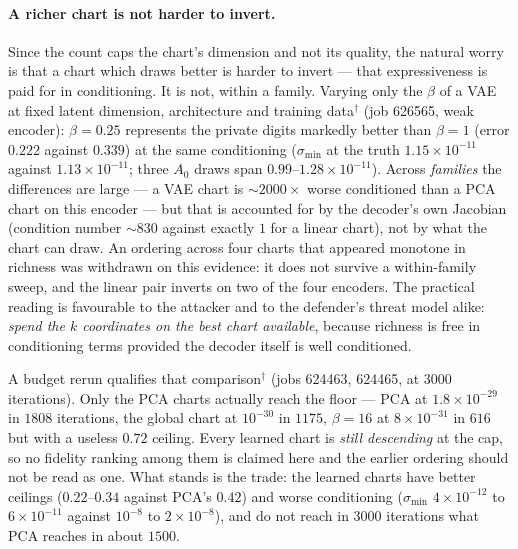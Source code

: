 \paragraph{A richer chart is not harder to invert.} Since the count caps the
chart's dimension and not its quality, the natural worry is that a chart
which draws better is harder to invert — that expressiveness is paid for in
conditioning. It is not, within a family. Varying only the $\beta$ of a VAE
at fixed latent dimension, architecture and training data$^\dagger$ (job
626565, weak encoder): $\beta=0.25$ represents the private digits markedly
better than $\beta=1$ (error $0.222$ against $0.339$) at the same
conditioning ($\sigma_{\min}$ at the truth $1.15\times10^{-11}$ against
$1.13\times10^{-11}$; three $A_0$ draws span $0.99$--$1.28\times10^{-11}$).
Across \emph{families} the differences are large — a VAE chart is
${\sim}2000\times$ worse conditioned than a PCA chart on this encoder — but
that is accounted for by the decoder's own Jacobian (condition number
${\sim}830$ against exactly $1$ for a linear chart), not by what the chart
can draw. An ordering across four charts that appeared monotone in richness
was withdrawn on this evidence: it does not survive a within-family sweep,
and the linear pair inverts on two of the four encoders. The practical
reading is favourable to the attacker and to the defender's
threat model alike: \emph{spend the $k$ coordinates on the best chart
available}, because richness is free in conditioning terms provided the
decoder itself is well conditioned.

A budget rerun qualifies that comparison$^\dagger$ (jobs 624463, 624465, at
$3000$ iterations). Only the PCA charts actually reach the floor --- PCA at
$1.8\times10^{-29}$ in $1808$ iterations, the global chart at $10^{-30}$ in
$1175$, $\beta=16$ at $8\times10^{-31}$ in $616$ but with a useless $0.72$
ceiling. Every learned chart is \emph{still descending} at the cap, so no
fidelity ranking among them is claimed here and the earlier ordering should
not be read as one. What stands is the trade: the learned charts have better
ceilings ($0.22$--$0.34$ against PCA's $0.42$) and worse conditioning
($\sigma_{\min}$ $4\times10^{-12}$ to $6\times10^{-11}$ against
$10^{-8}$ to $2\times10^{-8}$), and do not reach in $3000$ iterations what PCA
reaches in about $1500$.

